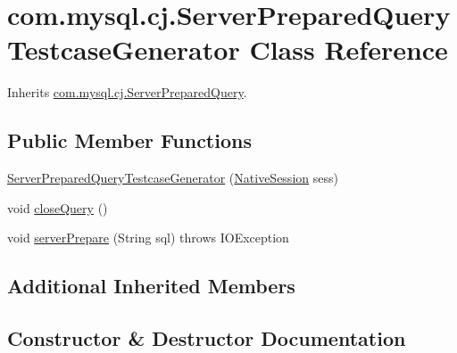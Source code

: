 \hypertarget{classcom_1_1mysql_1_1cj_1_1_server_prepared_query_testcase_generator}{}\section{com.\+mysql.\+cj.\+Server\+Prepared\+Query\+Testcase\+Generator Class Reference}
\label{classcom_1_1mysql_1_1cj_1_1_server_prepared_query_testcase_generator}


Inherits \mbox{\hyperlink{classcom_1_1mysql_1_1cj_1_1_server_prepared_query}{com.\+mysql.\+cj.\+Server\+Prepared\+Query}}.

\subsection*{Public Member Functions}
\begin{DoxyCompactItemize}
\item 
\mbox{\hyperlink{classcom_1_1mysql_1_1cj_1_1_server_prepared_query_testcase_generator_aa8abc7f158173c2aeccab1c21cc0c9d3}{Server\+Prepared\+Query\+Testcase\+Generator}} (\mbox{\hyperlink{classcom_1_1mysql_1_1cj_1_1_native_session}{Native\+Session}} sess)
\item 
void \mbox{\hyperlink{classcom_1_1mysql_1_1cj_1_1_server_prepared_query_testcase_generator_a10e0c29e30d505db6ede8ff438433b2e}{close\+Query}} ()
\item 
void \mbox{\hyperlink{classcom_1_1mysql_1_1cj_1_1_server_prepared_query_testcase_generator_a5f5e28b35850a09946026c0d5f462500}{server\+Prepare}} (String sql)  throws I\+O\+Exception 
\end{DoxyCompactItemize}
\subsection*{Additional Inherited Members}


\subsection{Constructor \& Destructor Documentation}
\mbox{\label{classcom_1_1mysql_1_1cj_1_1_server_prepared_query_testcase_generator_aa8abc7f158173c2aeccab1c21cc0c9d3}} 
